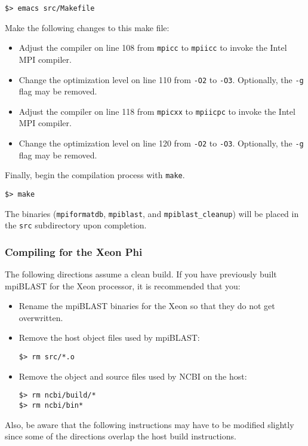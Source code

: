 \documentclass[10pt]{article}
\begin{document}
\begin{verbatim}
$> emacs src/Makefile
\end{verbatim}
\noindent Make the following changes to this make file:
\begin{itemize}
\item Adjust the compiler on line 108 from \verb^mpicc^ to \verb^mpiicc^ to invoke the Intel MPI compiler.
\item Change the optimization level on line 110 from \verb^-O2^ to \verb^-O3^.  Optionally, the \verb^-g^ flag may be removed.
\item Adjust the compiler on line 118 from \verb^mpicxx^ to \verb^mpiicpc^ to invoke the Intel MPI compiler.
\item Change the optimization level on line 120 from \verb^-O2^ to \verb^-O3^.  Optionally, the \verb^-g^ flag may be removed.
\end{itemize}
\noindent Finally, begin the compilation process with \verb^make^.
\begin{verbatim}
$> make
\end{verbatim}
\noindent The binaries (\verb^mpiformatdb^, \verb^mpiblast^, and \verb^mpiblast_cleanup^) will be placed in the \verb^src^ subdirectory upon completion.

\subsubsection{Compiling for the Xeon Phi} \label{sssec:mpiblastphi}

 \small The following directions assume a clean build.  If you have previously built mpiBLAST for the Xeon processor, it is recommended that you:
\begin{itemize}
\item Rename the mpiBLAST binaries for the Xeon so that they do not get overwritten.
\item Remove the host object files used by mpiBLAST:
\begin{verbatim}
$> rm src/*.o
\end{verbatim}
\item Remove the object and source files used by NCBI on the host:
\begin{verbatim}
$> rm ncbi/build/*
$> rm ncbi/bin*
\end{verbatim}
\end{itemize}
\noindent Also, be aware that the following instructions may have to be modified slightly since some of the directions overlap the host build instructions.\\
\normalsize
\end{document}
